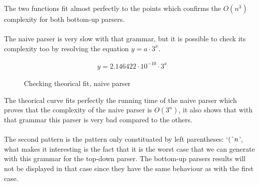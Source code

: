 The two functions fit almost perfectly to the points which confirms the $O(n^3)$ complexity for both bottom-up parsers.
\\
\\
The naive parser is very slow with that grammar, but it is possible to check its complexity too by resolving the equation $y = a \cdot 3^x$.

\begin{align*}
    &y = 2.146422 \cdot 10^{-10} \cdot 3^x
\end{align*}

\FloatBarrier
\begin{figure}[h]
\centering
{}
\caption{Checking theorical fit, naive parser}
\end{figure}
\FloatBarrier

The theorical curve fits perfectly the running time of the naive parser which proves that the complexity of the naive parser is $O(3^n)$, it also shows that with that grammar this parser is very bad compared to the others.
\\
\\
The second pattern is the pattern only constituated by left parentheses: `$(\string^ n$', what makes it interesting is the fact that it is the worst case that we can generate with this grammar for the top-down parser.
The bottom-up parsers results will not be displayed in that case since they have the same behaviour as with the first case.

